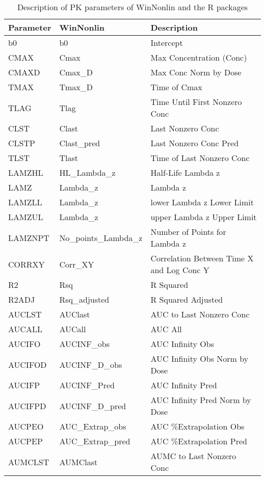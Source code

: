 \documentclass[12pt,]{krantz}
\theoremstyle{definition}
\theoremstyle{definition}
\theoremstyle{definition}
\theoremstyle{remark}
\begin{document}
\begin{table}

\caption{\label{tab:table1}Description of PK parameters of WinNonlin and the R packages}
\centering
\begin{tabular}[t]{l|l|l}
\hline
Parameter & WinNonlin & Description\\
\hline
b0 & b0 & Intercept\\
\hline
CMAX & Cmax & Max Concentration (Conc)\\
\hline
CMAXD & Cmax\_D & Max Conc Norm by Dose\\
\hline
TMAX & Tmax\_D & Time of Cmax\\
\hline
TLAG & Tlag & Time Until First Nonzero Conc\\
\hline
CLST & Clast & Last Nonzero Conc\\
\hline
CLSTP & Clast\_pred & Last Nonzero Conc Pred\\
\hline
TLST & Tlast & Time of Last Nonzero Conc\\
\hline
LAMZHL & HL\_Lambda\_z & Half-Life Lambda z\\
\hline
LAMZ & Lambda\_z & Lambda z\\
\hline
LAMZLL & Lambda\_z & lower Lambda z Lower Limit\\
\hline
LAMZUL & Lambda\_z & upper Lambda z Upper Limit\\
\hline
LAMZNPT & No\_points\_Lambda\_z & Number of Points for Lambda z\\
\hline
CORRXY & Corr\_XY & Correlation Between Time X and Log Conc Y\\
\hline
R2 & Rsq & R Squared\\
\hline
R2ADJ & Rsq\_adjusted & R Squared Adjusted\\
\hline
AUCLST & AUClast & AUC to Last Nonzero Conc\\
\hline
AUCALL & AUCall & AUC All\\
\hline
AUCIFO & AUCINF\_obs & AUC Infinity Obs\\
\hline
AUCIFOD & AUCINF\_D\_obs & AUC Infinity Obs Norm by Dose\\
\hline
AUCIFP & AUCINF\_Pred & AUC Infinity Pred\\
\hline
AUCIFPD & AUCINF\_D\_pred & AUC Infinity Pred Norm by Dose\\
\hline
AUCPEO & AUC\_Extrap\_obs & AUC \%Extrapolation Obs\\
\hline
AUCPEP & AUC\_Extrap\_pred & AUC \%Extrapolation Pred\\
\hline
AUMCLST & AUMClast & AUMC to Last Nonzero Conc\\

\end{tabular}
\end{table}
\end{document}
